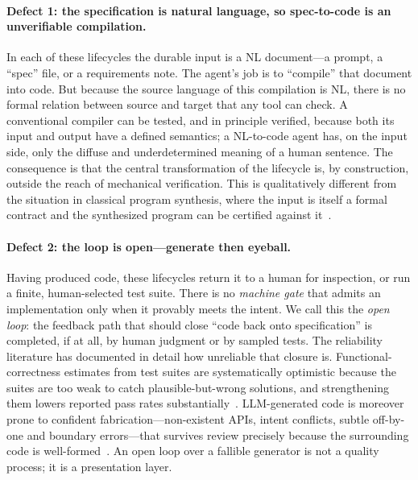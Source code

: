 \paragraph{Defect 1: the specification is natural language, so spec-to-code is an unverifiable compilation.}
In each of these lifecycles the durable input is a NL document---a prompt, a ``spec'' file, or a requirements note. The agent's job is to ``compile'' that document into code. But because the source language of this compilation is NL, there is no formal relation between source and target that any tool can check. A conventional compiler can be tested, and in principle verified, because both its input and output have a defined semantics; a NL-to-code agent has, on the input side, only the diffuse and underdetermined meaning of a human sentence. The consequence is that the central transformation of the lifecycle is, by construction, outside the reach of mechanical verification. This is qualitatively different from the situation in classical program synthesis, where the input is itself a formal contract and the synthesized program can be certified against it~\cite{manna1980deductive,solarlezama2008sketching}.

\paragraph{Defect 2: the loop is open---generate then eyeball.}
Having produced code, these lifecycles return it to a human for inspection, or run a finite, human-selected test suite. There is no \emph{machine gate} that admits an implementation only when it provably meets the intent. We call this the \emph{open loop}: the feedback path that should close ``code back onto specification'' is completed, if at all, by human judgment or by sampled tests. The reliability literature has documented in detail how unreliable that closure is. Functional-correctness estimates from test suites are systematically optimistic because the suites are too weak to catch plausible-but-wrong solutions, and strengthening them lowers reported pass rates substantially~\cite{liu2023evalplus,chen2021codex}. LLM-generated code is moreover prone to confident fabrication---non-existent APIs, intent conflicts, subtle off-by-one and boundary errors---that survives review precisely because the surrounding code is well-formed~\cite{zhang2025hallucination}. An open loop over a fallible generator is not a quality process; it is a presentation layer.

